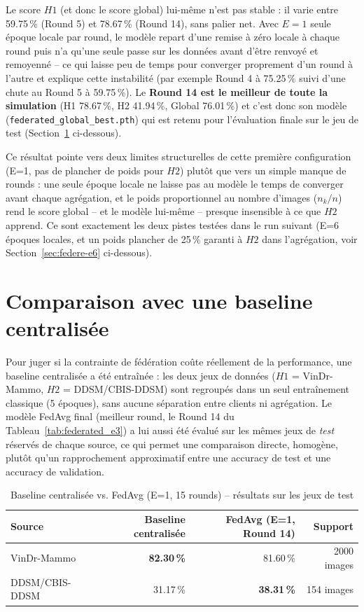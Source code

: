 \documentclass[12pt,a4paper]{report}
\begin{document}
Le score $H1$ (et donc le score global) lui-même n'est pas stable : il
varie entre 59.75\,\% (Round 5) et 78.67\,\% (Round 14), sans palier net.
Avec $E{=}1$ seule époque locale par round, le modèle repart d'une remise à
zéro locale à chaque round puis n'a qu'une seule passe sur les données
avant d'être renvoyé et remoyenné -- ce qui laisse peu de temps pour
converger proprement d'un round à l'autre et explique cette instabilité
(par exemple Round 4 à 75.25\,\% suivi d'une chute au Round 5 à 59.75\,\%).
Le \textbf{Round 14 est le meilleur de toute la simulation} (H1 78.67\,\%,
H2 41.94\,\%, Global 76.01\,\%) et c'est donc son modèle
(\texttt{federated\_global\_best.pth}) qui est retenu pour l'évaluation
finale sur le jeu de test (Section~\ref{sec:federe-baseline} ci-dessous).

Ce résultat pointe vers deux limites structurelles de cette première
configuration (E=1, pas de plancher de poids pour $H2$) plutôt que vers un
simple manque de rounds : une seule époque locale ne laisse pas au modèle
le temps de converger avant chaque agrégation, et le poids proportionnel
au nombre d'images ($n_k/n$) rend le score global -- et le modèle lui-même
-- presque insensible à ce que $H2$ apprend. Ce sont exactement les deux
pistes testées dans le run suivant (E=6 époques locales, et un poids
plancher de 25\,\% garanti à $H2$ dans l'agrégation, voir
Section~\ref{sec:federe-e6} ci-dessous).

\section{Comparaison avec une baseline centralisée}
\label{sec:federe-baseline}

Pour juger si la contrainte de fédération coûte réellement de la
performance, une baseline centralisée a été entraînée : les deux jeux de
données ($H1$ = VinDr-Mammo, $H2$ = DDSM/CBIS-DDSM) sont regroupés dans un
seul entraînement classique (5 époques), sans aucune séparation entre
clients ni agrégation. Le modèle FedAvg final (meilleur round, le Round 14
du Tableau~\ref{tab:federated_e3}) a lui aussi été évalué sur les mêmes
jeux de \emph{test} réservés de chaque source, ce qui permet une
comparaison directe, homogène, plutôt qu'un rapprochement approximatif
entre une accuracy de test et une accuracy de validation.

\begin{table}[h]
\centering
\caption{Baseline centralisée vs. FedAvg (E=1, 15 rounds) -- résultats sur les jeux de test}
\label{tab:federated_vs_centralized}
\begin{tabular}{lrrr}
\toprule
Source & Baseline centralisée & FedAvg (E=1, Round 14) & Support \\
\midrule
VinDr-Mammo & \textbf{82.30\,\%} & 81.60\,\% & 2000 images \\
DDSM/CBIS-DDSM & 31.17\,\% & \textbf{38.31\,\%} & 154 images \\
\bottomrule
\end{tabular}
\end{table}
\end{document}
